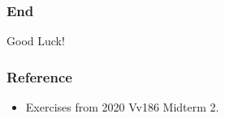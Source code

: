 \documentclass{beamer}
\begin{document}
\begin{frame}
    \frametitle{End}
    \centering
    \LARGE{Good Luck!}
\end{frame}

\begin{frame}
    \frametitle{Reference}
    \begin{itemize}
        \item Exercises from 2020 Vv186 Midterm 2.
    \end{itemize}
\end{frame}
\end{document}
